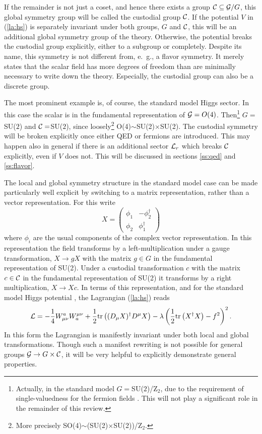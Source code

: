 \documentclass[final,12pt,3p,longtitle]{elsarticle}
\newcommand*{\La}{{\cal{L}}}
\newcommand*{\no}{\noindent}
\newcommand*{\be}{\begin{equation}}
\newcommand*{\ee}{\end{equation}}
\newcommand*{\pref}[1]{(\ref{#1})}
\newcommand*{\mn}{{\mu\nu}}
\newcommand*{\tr}{\mathrm{tr}}
\newcommand*{\1}{1\!\!\!\bot}
\newcommand*{\bma}{\begin{matrix}}
\newcommand*{\ema}{\end{matrix}}
\newcommand*{\bpm}{\left(\bma}
\newcommand*{\epm}{\ema\right)}
\begin{document}
If the remainder is not just a coset, and hence there exists a group ${\cal C}\subseteq{\cal G}/G$, this global symmetry group will be called the custodial group ${\cal C}$. If the potential $V$ in \pref{la:hs} is separately invariant under both groups, $G$ and ${\cal C}$, this will be an additional global symmetry group of the theory. Otherwise, the potential breaks the custodial group explicitly, either to a subgroup or completely. Despite its name, this symmetry is not different from, e.\ g., a flavor symmetry. It merely states that the scalar field has more degrees of freedom than are minimally necessary to write down the theory. Especially, the custodial group can also be a discrete group.

The most prominent example is, of course, the standard model Higgs sector. In this case the scalar is in the fundamental representation of ${\cal G}=O(4)$. Then\footnote{Actually, in the standard model $G=$SU($2$)/Z$_2$, due to the requirement of single-valuedness for the fermion fields \cite{O'Raifeartaigh:1986vq}. This will not play a significant role in the remainder of this review.} $G=$SU($2$) and ${\cal C}=$SU($2$), since loosely\footnote{More precisely SO(4)$\sim$(SU(2)$\times$SU(2))/Z$_2$.} O(4)$\sim$SU(2)$\times$SU(2). The custodial symmetry will be broken explicitly once either QED or fermions are introduced. This may happen also in general if there is an additional sector $\La_r$ which breaks ${\cal C}$ explicitly, even if $V$ does not. This will be discussed in sections \ref{ss:qed} and \ref{ss:flavor}.

The local and global symmetry structure in the standard model case can be made particularly well explicit by switching to a matrix representation, rather than a vector representation. For this write \cite{Shifman:2012zz}
\be
X=\bpm \phi_1 & -\phi_2^\dagger\\ \phi_2 & \phi_1^\dagger \epm\label{higgsx}
\ee
\no where $\phi_i$ are the usual components of the complex vector representation. In this representation the field transforms by a left-multiplication under a gauge transformation, $X\to gX$ with the matrix $g\in G$ in the fundamental representation of SU(2). Under a custodial transformation $c$ with the matrix $c\in{\cal C}$ in the fundamental representation of SU(2) it transforms by a right multiplication, $X\to X c$. In terms of this representation, and for the standard model Higgs potential \cite{Bohm:2001yx}, the Lagrangian \pref{la:hs} reads \cite{Shifman:2012zz}
\be
\La=-\frac{1}{4}W_\mn^aW^\mn_a+\frac{1}{2}\tr\left((D_\mu X)^\dagger D^\mu X\right)-\lambda\left(\frac{1}{2}\tr\left(X^\dagger X\right)-f^2\right)^2\label{la:hsx}.
\ee
\no In this form the Lagrangian is manifestly invariant under both local and global transformations. Though such a manifest rewriting is not possible for general groups ${\cal G}\to G\times{\cal C}$, it will be very helpful to explicitly demonstrate general properties.
\end{document}
